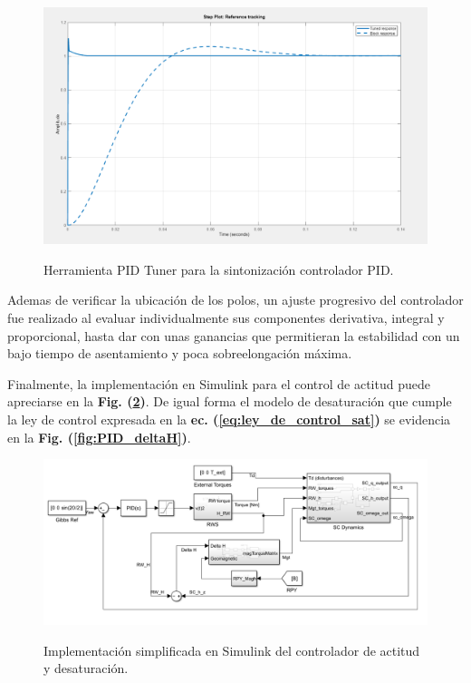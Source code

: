\begin{figure}[!h]
	\begin{center}
		\includegraphics[scale=0.32]{imagenes/controladores/PID_tuning2.PNG}\\
	\end{center}
	\caption{Herramienta PID Tuner para la sintonización controlador PID.}
	\label{fig:PID_tuner}	 	
\end{figure}

Ademas de verificar la ubicación de los polos, un ajuste progresivo del controlador fue realizado al evaluar individualmente sus componentes derivativa, integral y proporcional, hasta dar con unas ganancias que permitieran la estabilidad con un bajo tiempo de asentamiento y poca sobreelongación máxima. 

Finalmente, la implementación en Simulink para el control de actitud puede apreciarse en la \textbf{Fig. (\ref{fig:PID})}. De igual forma el modelo de desaturación que cumple la ley de control expresada en la \textbf{ec. (\ref{eq:ley_de_control_sat})} se evidencia en la \textbf{Fig. (\ref{fig:PID_deltaH})}.

\begin{figure}[!ht]
	\begin{center}
		\includegraphics[scale=0.37]{imagenes/controladores/PID.PNG}\\
	\end{center}
	\caption{Implementación simplificada en Simulink del controlador de actitud y desaturación.}
	\label{fig:PID}	 	
\end{figure}

